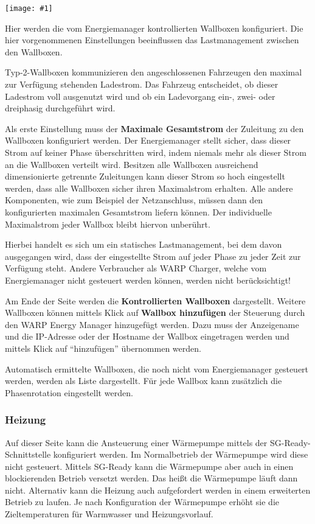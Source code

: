 \documentclass[a4paper,10pt]{article}
\newcommand{\hint}[1]{\begin{tcolorbox}[colback=boxgray,colframe=black,coltext=
white,title=Hinweis,left*=2mm,right*=2mm,boxsep=1mm,bottom=1mm,top=1mm]#1\end{tcolorbox}}
\newcommand{\gfx}[1]{\texttt{[image: \#1]}}
\begin{document}
\begin{multicols*}{2}
	\gfx{./img_v2/wem2-web-wallbox}

	Hier werden die vom Energiemanager kontrollierten Wallboxen konfiguriert.
	Die hier vorgenommenen Einstellungen beeinflussen das Lastmanagement
	zwischen den Wallboxen.

	Typ-2-Wallboxen kommunizieren den angeschlossenen Fahrzeugen den maximal zur
	Verfügung stehenden Ladestrom. Das Fahrzeug entscheidet, ob dieser Ladestrom
	voll ausgenutzt wird und ob ein Ladevorgang ein-, zwei- oder dreiphasig durchgeführt
	wird.

	Als erste Einstellung muss der \textbf{Maximale Gesamtstrom}
	der Zuleitung zu den Wallboxen konfiguriert werden.
	Der Energiemanager stellt sicher, dass dieser
	Strom auf keiner Phase überschritten wird, indem niemals mehr als
	dieser Strom an die Wallboxen verteilt wird. Besitzen alle Wallboxen
	ausreichend dimensionierte getrennte Zuleitungen kann dieser Strom so
	hoch eingestellt werden, dass alle Wallboxen sicher ihren Maximalstrom
	erhalten. Alle andere Komponenten, wie zum Beispiel der Netzanschluss,
	müssen dann den konfigurierten maximalen Gesamtstrom liefern können.
	Der individuelle Maximalstrom jeder Wallbox bleibt hiervon unberührt.

	\hint{Hierbei handelt es sich um ein statisches Lastmanagement, bei dem
	davon ausgegangen wird, dass der eingestellte Strom auf jeder Phase
	zu jeder Zeit zur Verfügung steht. Andere Verbraucher als WARP Charger,
	welche vom Energiemanager nicht gesteuert werden können, werden nicht
	berücksichtigt!}

	Am Ende der Seite werden die \textbf{Kontrollierten
	Wallboxen} dargestellt. Weitere Wallboxen können mittels Klick auf
	\textbf{Wallbox hinzufügen} der Steuerung durch den WARP Energy Manager
	hinzugefügt werden. Dazu muss der Anzeigename und die IP-Adresse oder der
	Hostname der Wallbox eingetragen werden und mittels Klick auf \enquote{hinzufügen} übernommen werden.

	Automatisch ermittelte Wallboxen, die noch nicht vom Energiemanager
	gesteuert werden, werden als Liste dargestellt. Für jede Wallbox kann zusätzlich
    die Phasenrotation eingestellt werden.

    \subsubsection{Heizung}


    Auf dieser Seite kann die Ansteuerung einer Wärmepumpe mittels der SG-Ready-Schnittstelle konfiguriert werden. Im Normalbetrieb der Wärmepumpe wird diese nicht gesteuert.
    Mittels SG-Ready kann die Wärmepumpe aber auch in einen blockierenden Betrieb versetzt werden. Das heißt die Wärmepumpe läuft dann nicht.
    Alternativ kann die Heizung auch aufgefordert werden in einem erweiterten Betrieb zu laufen. Je nach Konfiguration der Wärmepumpe erhöht sie die Zieltemperaturen für Warmwasser und Heizungsvorlauf.


\end{multicols*}
\end{document}
